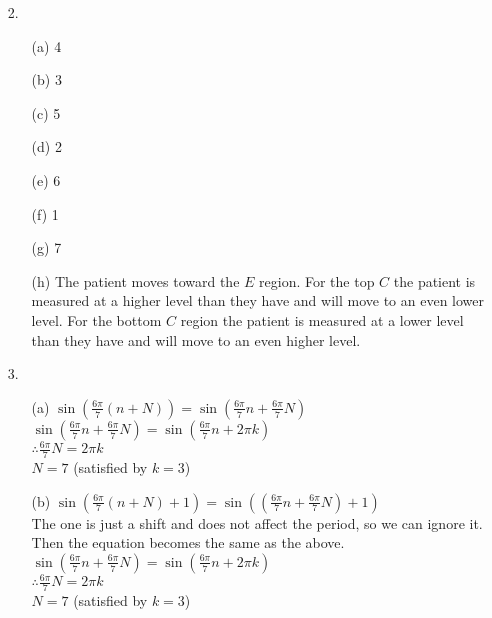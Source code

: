 \documentclass{article}
\begin{document}
\begin{enumerate}
\newpage

\item[2.]
	\begin{enumerate}
	\item[(a)]4
	\item[(b)]3
	\item[(c)]5
	\item[(d)]2
	\item[(e)]6
	\item[(f)]1
	\item[(g)]7
	\item[(h)]The patient moves toward the $E$ region. For the top $C$ the patient is measured at a higher level than they have and will move to an even lower level. For the bottom $C$ region the patient is measured at a lower level than they have and will move to an even higher level.
	\end{enumerate}

\newpage

\item[3.]
	\begin{enumerate}
	\item[(a)]
			$\sin\left(\frac{6\pi}{7}\left(n + N\right)\right) = \sin\left(\frac{6\pi}{7}n + \frac{6\pi}{7}N\right)$\\
			
			$\sin\left(\frac{6\pi}{7}n + \frac{6\pi}{7}N\right) = \sin\left(\frac{6\pi}{7}n + 2\pi k\right)$\\
			
			$\therefore \frac{6\pi}{7}N = 2\pi k$\\
			
			$N = 7$ (satisfied by $k=3$)\\

	\item[(b)]
			$\sin\left(\frac{6\pi}{7}\left(n + N\right) + 1\right) = \sin\left(\left(\frac{6\pi}{7}n + \frac{6\pi}{7}N\right) + 1\right)$\\
			
			The one is just a shift and does not affect the period, so we can ignore it. Then the equation becomes the same as the above.\\
			
			$\sin\left(\frac{6\pi}{7}n + \frac{6\pi}{7}N\right) = \sin\left(\frac{6\pi}{7}n + 2\pi k\right)$\\
			
			$\therefore \frac{6\pi}{7}N = 2\pi k$\\
			
			$N = 7$ (satisfied by $k=3$)\\


\end{enumerate}
\end{enumerate}
\end{document}
